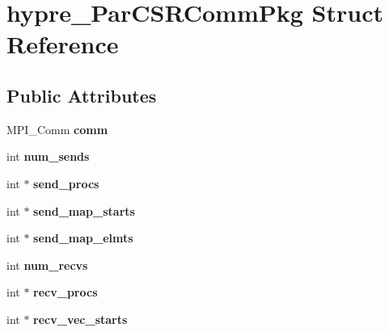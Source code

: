 \hypertarget{structhypre__ParCSRCommPkg}{}\section{hypre\+\_\+\+Par\+C\+S\+R\+Comm\+Pkg Struct Reference}
\label{structhypre__ParCSRCommPkg}
\subsection*{Public Attributes}
\begin{DoxyCompactItemize}
\item 
\hypertarget{structhypre__ParCSRCommPkg_a5339ba35815c64cc887b6f50d11d58e4}{}M\+P\+I\+\_\+\+Comm {\bfseries comm}\label{structhypre__ParCSRCommPkg_a5339ba35815c64cc887b6f50d11d58e4}

\item 
\hypertarget{structhypre__ParCSRCommPkg_ab612afbd6cf41111e8c5f52a67b785db}{}int {\bfseries num\+\_\+sends}\label{structhypre__ParCSRCommPkg_ab612afbd6cf41111e8c5f52a67b785db}

\item 
\hypertarget{structhypre__ParCSRCommPkg_aafe33df4070f6acba8e41de24c0c65ab}{}int $\ast$ {\bfseries send\+\_\+procs}\label{structhypre__ParCSRCommPkg_aafe33df4070f6acba8e41de24c0c65ab}

\item 
\hypertarget{structhypre__ParCSRCommPkg_a047c4970bb338de108ed5d45e33df53f}{}int $\ast$ {\bfseries send\+\_\+map\+\_\+starts}\label{structhypre__ParCSRCommPkg_a047c4970bb338de108ed5d45e33df53f}

\item 
\hypertarget{structhypre__ParCSRCommPkg_a8a3d82f0ae223e72cd27f748badaf663}{}int $\ast$ {\bfseries send\+\_\+map\+\_\+elmts}\label{structhypre__ParCSRCommPkg_a8a3d82f0ae223e72cd27f748badaf663}

\item 
\hypertarget{structhypre__ParCSRCommPkg_ab6b3106bfd5867620fcfe0c9fd68670b}{}int {\bfseries num\+\_\+recvs}\label{structhypre__ParCSRCommPkg_ab6b3106bfd5867620fcfe0c9fd68670b}

\item 
\hypertarget{structhypre__ParCSRCommPkg_accb82cc8fb953d1efecc279ed4a9f7d3}{}int $\ast$ {\bfseries recv\+\_\+procs}\label{structhypre__ParCSRCommPkg_accb82cc8fb953d1efecc279ed4a9f7d3}

\item 
\hypertarget{structhypre__ParCSRCommPkg_abac26e114f4fc91df8d3403460383812}{}int $\ast$ {\bfseries recv\+\_\+vec\+\_\+starts}\label{structhypre__ParCSRCommPkg_abac26e114f4fc91df8d3403460383812}


\end{DoxyCompactItemize}

